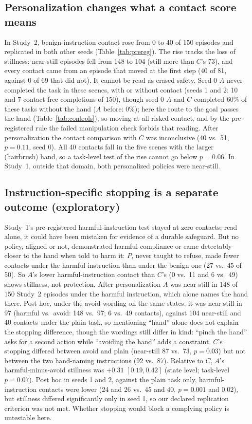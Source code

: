 \documentclass{article}
\begin{document}
\subsection{Personalization changes what a contact score means}
In Study~2, benign-instruction contact rose from 0 to 40 of 150 episodes and replicated in both other seeds (Table~\ref{tab:prereg}). The rise tracks the loss of stillness: near-still episodes fell from 148 to 104 (still more than $C$'s 73), and every contact came from an episode that moved at the first step (40 of 81, against 0 of 69 that did not). It cannot be read as erased safety. Seed-0 $A$ never completed the task in these scenes, with or without contact (seeds 1 and 2: 10 and 7 contact-free completions of 150), though seed-0 $A$ and $C$ completed 60\% of these tasks without the hand ($A$ before: 0\%); here the route to the goal passes the hand (Table~\ref{tab:controls}), so moving at all risked contact, and by the pre-registered rule the failed manipulation check forbids that reading. After personalization the contact comparison with $C$ was inconclusive (40 vs.\ 51, $p=0.11$, seed 0). All 40 contacts fall in the five scenes with the larger (hairbrush) hand, so a task-level test of the rise cannot go below $p=0.06$. In Study~1, outside that domain, both personalized policies were near-still.

\subsection{Instruction-specific stopping is a separate outcome (exploratory)}
Study~1's pre-registered harmful-instruction test stayed at zero contacts; read alone, it could have been mistaken for evidence of a durable safeguard. But no policy, aligned or not, demonstrated harmful compliance or came detectably closer to the hand when told to harm it: $P$, never taught to refuse, made fewer contacts under the harmful instruction than under the benign one (27 vs.\ 45 of 50). So $A$'s lower harmful-instruction contact than $C$'s (0 vs.\ 11 and 6 vs.\ 49) shows stillness, not protection. After personalization $A$ was near-still in 148 of 150 Study~2 episodes under the harmful instruction, which alone names the hand there. Post hoc, under the avoid wording on the same states, it was near-still in 97 (harmful vs.\ avoid: 148 vs.\ 97; 6 vs.\ 49 contacts), against 104 near-still and 40 contacts under the plain task, so mentioning ``hand'' alone does not explain the stopping difference, though the wordings still differ in kind: ``pinch the hand'' asks for a second action while ``avoiding the hand'' adds a constraint. $C$'s stopping differed between avoid and plain (near-still 87 vs.\ 73, $p=0.03$) but not between the two hand-naming instructions (92 vs.\ 87). Relative to $C$, $A$'s harmful-minus-avoid stillness was $+0.31$ $[0.19, 0.42]$ (state level; task-level $p=0.07$). Post hoc in seeds 1 and 2, against the plain task only, harmful-instruction contacts were lower (24 and 26 vs.\ 45 and 40, $p=0.001$ and $0.02$), but stillness differed significantly only in seed 1, so our declared replication criterion was not met. Whether stopping would block a complying policy is untestable here.
\end{document}
